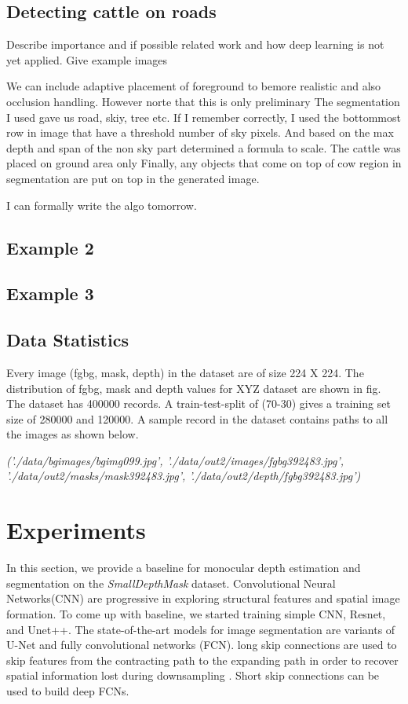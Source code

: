 \documentclass[review]{cvpr}
\begin{document}
\subsection{Detecting cattle on roads}
Describe importance and if possible related work and how deep learning is not yet applied.
Give example images


We can include adaptive placement of foreground to bemore realistic and also occlusion handling. However norte that this is only preliminary
The segmentation I used gave us road, skiy, tree etc. If I remember correctly, I used the bottommost row in image that have a threshold number of
sky pixels. And based on the max depth and span of the non sky part determined a formula to scale. The cattle was placed on ground area only
Finally, any objects that come on top of cow region in segmentation are put on top in the generated image.

I can formally write the algo tomorrow.


\subsection{Example 2} %

\subsection{Example 3} %




\subsection{Data Statistics}
Every image (fgbg, mask, depth) in the dataset are of size 224 X 224. 
The distribution of fgbg, mask and depth values for XYZ dataset are shown in fig. 
The dataset has 400000 records. A train-test-split of (70-30) gives a training set size of 280000 and 120000. 
A sample record in the dataset contains paths to all the images as shown below.

\textit{('./data/bgimages/bgimg099.jpg', 
'./data/out2/images/fgbg392483.jpg', 
'./data/out2/masks/mask392483.jpg', 
'./data/out2/depth/fgbg392483.jpg')}

\section{Experiments}
In this section, we provide a baseline for monocular depth estimation and segmentation on the \textit{SmallDepthMask} dataset. Convolutional Neural Networks(CNN) are progressive in exploring structural features and spatial image formation. To come up with baseline, we started  training simple CNN, Resnet, and Unet++. 
The state-of-the-art models for image segmentation are variants of U-Net and fully convolutional networks (FCN)\cite{drozdzal2016importance}. 
long skip connections are used to skip features from the contracting path to the expanding path in order to recover 
spatial information lost during downsampling \cite{zhou2019unet++}. Short skip connections can be used to build deep FCNs. 
\end{document}
